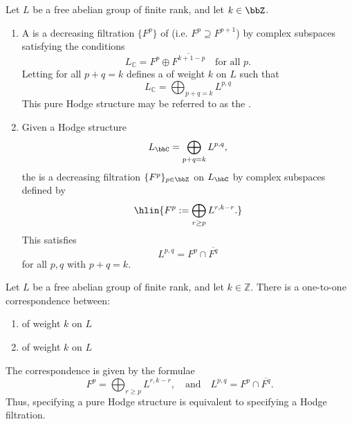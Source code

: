 \begin{definition} \label{definition:hodge_filtration_on_a_free_abelian_group_of_finite_rank_hodge_filtration_associated_to_a_hodge_structure}
    Let $L$ be a free abelian group of finite rank, and let $k \in \bbZ$. 
    \begin{enumerate}
        \item A  is a decreasing filtration $\{F^p\}$ of  (i.e. $F^p \supseteq F^{p+1}$) by complex subspaces satisfying the conditions
        \[ L_\mathbb{C} = F^p \oplus \overline{F^{k+1-p}} \quad \text{for all } p. \]
        Letting
        for all $p+q = k$ defines a  of weight $k$ on $L$ such that 
        $$L_{\mathbb{C}} = \bigoplus_{p+q = k} L^{p,q}$$
        This pure Hodge structure may be referred to as the .

        \item Given a Hodge structure 
        $$L_\bbC = \bigoplus_{p+q=k} L^{p,q},$$
        the  is a decreasing filtration $\{F^p\}_{p \in \bbZ}$ on $L_\bbC$ by complex subspaces defined by 
        $$\hlin{F^p := \bigoplus_{r \ge p} L^{r,k-r}.}$$
        This satisfies
        $$ L^{p,q} = F^p \cap \overline{F^q} $$
        for all $p,q$ with $p+q=k$.

    \end{enumerate}
\end{definition}
\begin{lemma}
    Let $L$ be a free abelian group of finite rank, and let $k \in \mathbb{Z}$.  There is a one-to-one correspondence between:

    \begin{enumerate}
        \item {} of weight $k$ on $L$
        \item {} of weight $k$ on $L$
    \end{enumerate}
    The correspondence is given by the formulae
    $$ F^p = \bigoplus_{r \ge p} L^{r,k-r}, \quad \text{and} \quad L^{p,q} = F^p \cap \overline{F^q}.  $$
    Thus, specifying a pure Hodge structure is equivalent to specifying a Hodge filtration.
\end{lemma}

